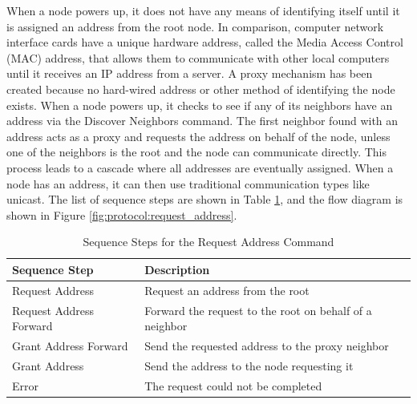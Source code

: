 When a node powers up, it does not have any means of identifying itself until it is assigned an address from the root node. In comparison, computer network interface cards have a unique hardware address, called the Media Access Control (MAC) address, that allows them to communicate with other local computers until it receives an IP address from a server. A proxy mechanism has been created because no hard-wired address or other method of identifying the node exists. When a node powers up, it checks to see if any of its neighbors have an address via the Discover Neighbors command. The first neighbor found with an address acts as a proxy and requests the address on behalf of the node, unless one of the neighbors is the root and the node can communicate directly. This process leads to a cascade where all addresses are eventually assigned. When a node has an address, it can then use traditional communication types like unicast. The list of sequence steps are shown in Table \ref{tab:protocol:request_address}, and the flow diagram is shown in Figure \ref{fig:protocol:request_address}.

\begin{table}
	\begin{center}
		\setlength{\extrarowheight}{1.5pt}
		\caption{Sequence Steps for the Request Address Command}
		\vspace{0.1cm}
		\begin{tabular}{|l|l|}
			\hline
			\textbf{Sequence Step} & \textbf{Description} \\
			\hline
			\hline
			Request Address & Request an address from the root \\
			\hline
			Request Address Forward & Forward the request to the root on behalf of a neighbor \\
			\hline
			Grant Address Forward & Send the requested address to the proxy neighbor \\
			\hline
			Grant Address & Send the address to the node requesting it \\
			\hline
			Error & The request could not be completed \\
			\hline
		\end{tabular}
		\label{tab:protocol:request_address}
	\end{center}
\end{table}


